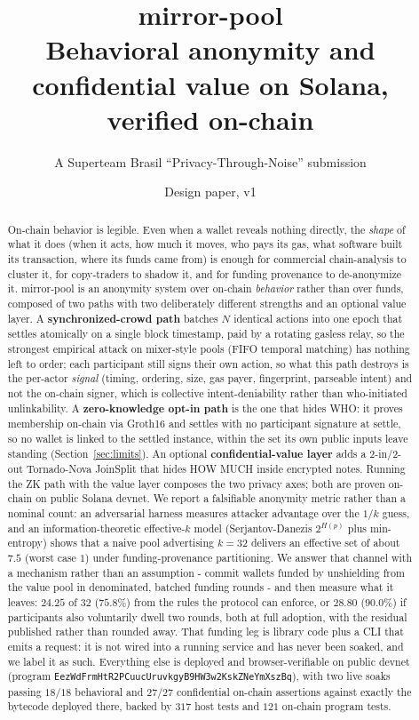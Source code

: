 \documentclass[10pt]{article}
\title{\textbf{mirror-pool}\\[0.3em]
\large Behavioral anonymity and confidential value on Solana,\\ verified on-chain}
\author{A Superteam Brasil ``Privacy-Through-Noise'' submission}
\date{Design paper, v1}
\newcommand{\code}[1]{\texttt{#1}}
\begin{document}
\maketitle

\begin{abstract}
\noindent
On-chain behavior is legible. Even when a wallet reveals nothing directly, the
\emph{shape} of what it does (when it acts, how much it moves, who pays its gas,
what software built its transaction, where its funds came from) is enough for
commercial chain-analysis to cluster it, for copy-traders to shadow it, and for
funding provenance to de-anonymize it. mirror-pool is an anonymity system over
on-chain \emph{behavior} rather than over funds, composed of two paths with two
deliberately different strengths and an optional value layer. A
\textbf{synchronized-crowd path} batches $N$ identical actions into one epoch that
settles atomically on a single block timestamp, paid by a rotating gasless relay,
so the strongest empirical attack on mixer-style pools (FIFO temporal matching)
has nothing left to order; each participant still signs their own action, so what
this path destroys is the per-actor \emph{signal} (timing, ordering, size, gas
payer, fingerprint, parseable intent) and not the on-chain signer, which is
collective intent-deniability rather than who-initiated unlinkability. A
\textbf{zero-knowledge opt-in path} is the one that hides WHO: it proves membership
on-chain via Groth16 and settles with no participant signature at settle, so no
wallet is linked to the settled instance, within the set its own public inputs
leave standing (Section~\ref{sec:limits}). An optional
\textbf{confidential-value layer} adds a 2-in/2-out Tornado-Nova JoinSplit that
hides HOW MUCH inside encrypted notes. Running the ZK path with the value layer
composes the two privacy axes; both are proven on-chain on public Solana devnet. We
report a falsifiable anonymity metric rather than a nominal count: an adversarial
harness measures attacker advantage over the $1/k$ guess, and an
information-theoretic effective-$k$ model (Serjantov-Danezis $2^{H(p)}$ plus
min-entropy) shows that a naive pool advertising $k=32$ delivers an effective set
of about $7.5$ (worst case $1$) under funding-provenance partitioning. We answer
that channel with a mechanism rather than an assumption - commit wallets funded by
unshielding from the value pool in denominated, batched funding rounds - and then
measure what it leaves: $24.25$ of $32$ ($75.8\%$) from the rules the protocol can
enforce, or $28.80$ ($90.0\%$) if participants also voluntarily dwell two rounds,
both at full adoption, with the residual published rather than rounded away. That
funding leg is library code plus a CLI that emits a request: it is not wired into a
running service and has never been soaked, and we label it as such. Everything else
is deployed and browser-verifiable on public devnet (program
\code{Eez\-Wd\-Frm\-HtR2\-PCuuc\-Uruvkgy\-B9HW3\-w2Ksk\-ZNeY\-mX\-szBq}),
with two live soaks passing $18/18$ behavioral and $27/27$ confidential on-chain
assertions against exactly the bytecode deployed there, backed by $317$ host tests
and $121$ on-chain program tests.
\end{abstract}
\end{document}
